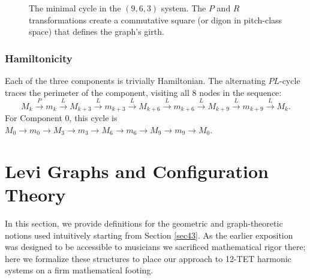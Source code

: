 \documentclass[12pt,letterpaper]{amsart}
\begin{document}
\begin{figure}[H]
    \centering
    \caption{The minimal cycle in the $(9,6,3)$ system. The $P$ and $R$ transformations create a commutative square (or digon in pitch-class space) that defines the graph's girth.}
    \label{fig:equal_minimal}
\end{figure}

\subsubsection{Hamiltonicity}
Each of the three components is trivially Hamiltonian. The alternating $PL$-cycle traces the perimeter of the component, visiting all 8 nodes in the sequence:
\[ M_k \xrightarrow{P} m_k \xrightarrow{L} M_{k+3} \xrightarrow{L} m_{k+3} \xrightarrow{L} M_{k+6} \xrightarrow{L} m_{k+6} \xrightarrow{L} M_{k+9} \xrightarrow{L} m_{k+9} \xrightarrow{L} M_{k} .\]
For Component 0, this cycle is $M_0 \to m_0 \to M_3 \to m_3 \to M_6 \to m_6 \to M_9 \to m_9 \to M_0$.

\section{Levi Graphs and Configuration Theory}\label{sec8} 

In this section, we provide definitions for the geometric and graph-theoretic notions used intuitively starting from Section \ref{sec43}. As the earlier exposition was designed to be accessible to musicians we sacrificed mathematical rigor there; here we formalize these structures to place our approach to 12-TET harmonic systems on a firm mathematical footing.
\end{document}
